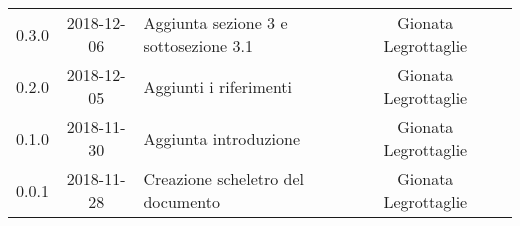 {\begin{longtable}{ c c C{4cm}  c  c }
		0.3.0 & 2018-12-06 & Aggiunta sezione 3 e sottosezione 3.1 & Gionata Legrottaglie & \reda{} \\ 
		
		0.2.0 & 2018-12-05 & Aggiunti i riferimenti & Gionata Legrottaglie & \reda{} \\ 
		
		0.1.0 & 2018-11-30 & Aggiunta introduzione & Gionata Legrottaglie & \reda{} \\
		
		0.0.1 & 2018-11-28 & Creazione scheletro del documento & Gionata Legrottaglie & \reda{}\\
		
	\end{longtable}

}